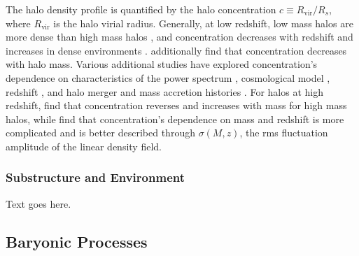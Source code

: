The halo density profile is quantified by the halo concentration $c \equiv R_{\mathrm{vir}} / R_{s}$, where $R_{\mathrm{vir}}$ is the halo virial radius.  Generally, at low redshift, low mass halos are more dense than high mass halos \citep{1997ApJ...490..493N}, and concentration decreases with redshift and increases in dense environments \citep{2001MNRAS.321..559B}.  \citet{2007MNRAS.381.1450N} additionally find that concentration decreases with halo mass.  Various additional studies have explored concentration's dependence on characteristics of the power spectrum \citep{2001ApJ...554..114E}, cosmological model \citep{2008MNRAS.391.1940M}, redshift \citep{2008MNRAS.387..536G, 2011MNRAS.411..584M}, and halo merger and mass accretion histories \citep{2002ApJ...568...52W, 2003MNRAS.339...12Z, 2009ApJ...707..354Z}.  For halos at high redshift, \citet{2011ApJ...740..102K} find that concentration reverses and increases with mass for high mass halos, while \citet{2012MNRAS.423.3018P} find that concentration's dependence on mass and redshift is more complicated and is better described through $\sigma(M,z)$, the rms fluctuation amplitude of the linear density field.



\subsubsection{Substructure and Environment}
\label{subsubsec:early_universe--halo_properties--structure}


Text goes here.




\subsection{Baryonic Processes}
\label{subsec:early_universe--baryonic_processes}


